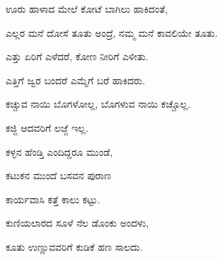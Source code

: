 \noindent\hspace*{0.6em}\kbvbullet\hspace{0.55em}ಊರು ಹಾಳಾದ ಮೇಲೆ ಕೋಟೆ ಬಾಗಿಲು ಹಾಕಿದಂತೆ,\par

\noindent\hspace*{0.6em}\kbvbullet\hspace{0.55em}ಎಲ್ಲರ ಮನೆ ದೋಸೆ ತೂತು ಅಂದ್ರೆ, ನಮ್ಮ ಮನೆ ಕಾವಲಿಯೇ ತೂತು.\par

\noindent\hspace*{0.6em}\kbvbullet\hspace{0.55em}ಎತ್ತು ಏರಿಗೆ ಎಳೆದರೆ, ಕೋಣ ನೀರಿಗೆ ಎಳೀತು.\par

\noindent\hspace*{0.6em}\kbvbullet\hspace{0.55em}ಎತ್ತಿಗೆ ಜ್ವರ ಬಂದರೆ ಎಮ್ಮೆಗೆ ಬರೆ ಹಾಕಿದರು.\par

\noindent\hspace*{0.6em}\kbvbullet\hspace{0.55em}ಕಚ್ಚುವ ನಾಯಿ ಬೊಗಳೋಲ್ಲ, ಬೊಗಳುವ ನಾಯಿ ಕಚ್ಚೊಲ್ಲ.\par

\noindent\hspace*{0.6em}\kbvbullet\hspace{0.55em}ಕಜ್ಜಿ ಆದವರಿಗೆ ಲಜ್ಜೆ ಇಲ್ಲ.\par

\noindent\hspace*{0.6em}\kbvbullet\hspace{0.55em}ಕಳ್ಳನ ಹೆಂಡ್ತಿ ಎಂದಿದ್ದರೂ ಮುಂಡೆ,\par

\noindent\hspace*{0.6em}\kbvbullet\hspace{0.55em}ಕಟುಕನ ಮುಂದೆ ಬಸವನ ಪುರಾಣ\par

\noindent\hspace*{0.6em}\kbvbullet\hspace{0.55em}ಕಾರ್ಯವಾಸಿ ಕತ್ತೆ ಕಾಲು ಕಟ್ಟು.\par

\noindent\hspace*{0.6em}\kbvbullet\hspace{0.55em}ಕುಣಿಯಲಾರದ ಸೂಳೆ ನೆಲ ಡೊಂಕು ಅಂದಳು,\par

\noindent\hspace*{0.6em}\kbvbullet\hspace{0.55em}ಕೂತು ಉಣ್ಣುವವರಿಗೆ ಕುಡಿಕೆ ಹಣ ಸಾಲದು.\par

